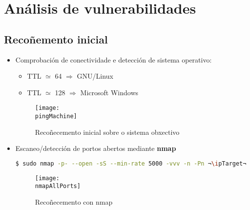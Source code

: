 \documentclass[a4paper]{article}
\newcommand{\pingMachine}{ping_intelligence.png}
\newcommand{\nmapAllPorts}{nmap_intelligence_allPorts.png}
\newcommand{\ipTarget}{10.10.10.248}
\begin{document}
        \clearpage

        \section{Análisis de vulnerabilidades}
        \subsection{Recoñemento inicial}
        \vspace{0.2cm}
        \begin{itemize}
                \item Comprobación de conectividade e detección de sistema operativo: 
                \begin{itemize}
                        \item TTL $\simeq$ 64 $\Rightarrow$ GNU/Linux
                        \item TTL $\simeq$ 128 $\Rightarrow$ Microsoft Windows
                \end{itemize}

        \begin{figure}[h]
                \begin{center}
                        \begin{tcolorbox}[colback=black,hbox]
                                \texttt{[image: \\pingMachine]}
                        \end{tcolorbox}
                \end{center}
                \caption{Recoñecemento inicial sobre o sistema obxectivo}
        \end{figure}

        \vspace{0.2cm}

                \item Escaneo/detección de portos abertos mediante \textbf{nmap}
        \begin{lstlisting}[language=Bash, caption=nmap: Portos TCP open]
$ sudo nmap -p- --open -sS --min-rate 5000 -vvv -n -Pn ¬\ipTarget¬
        \end{lstlisting}
         \begin{figure}[h]
                \begin{center}
                        \begin{tcolorbox}[colback=black,hbox]
                                \centering
                                \texttt{[image: \\nmapAllPorts]}
                        \end{tcolorbox}
                \end{center}
                \caption{Recoñecemento con nmap}
        \end{figure}


\end{itemize}
\end{document}
